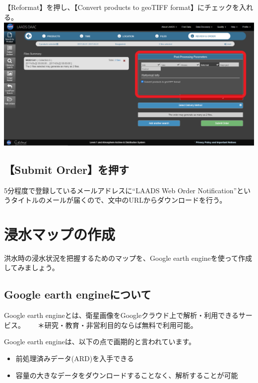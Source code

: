 \documentclass[
]{book}
\begin{document}
【Reformat】を押し、【Convert products to geoTIFF format】にチェックを入れる。
\includegraphics{images/LD-7.png}

\hypertarget{submit-orderux3092ux62bcux3059}{%
\section{【Submit Order】を押す}\label{submit-orderux3092ux62bcux3059}}

5分程度で登録しているメールアドレスに``LAADS Web Order Notification''というタイトルのメールが届くので、文中のURLからダウンロードを行う。

\hypertarget{ux6d78ux6c34ux30deux30c3ux30d7ux306eux4f5cux6210}{%
\chapter{浸水マップの作成}\label{ux6d78ux6c34ux30deux30c3ux30d7ux306eux4f5cux6210}}

洪水時の浸水状況を把握するためのマップを、Google earth engineを使って作成してみましょう。　　

\hypertarget{google-earth-engineux306bux3064ux3044ux3066}{%
\section{Google earth engineについて}\label{google-earth-engineux306bux3064ux3044ux3066}}

Google earth engineとは、衛星画像をGoogleクラウド上で解析・利用できるサービス。　　
＊研究・教育・非営利目的ならば無料で利用可能。　　

Google earth engineは、以下の点で画期的と言われています。　　

\begin{itemize}
\item
  前処理済みデータ(ARD)を入手できる　　
\item
  容量の大きなデータをダウンロードすることなく、解析することが可能　　
\end{itemize}
\end{document}
